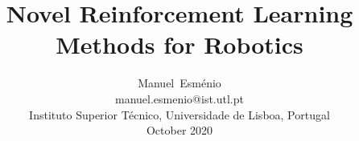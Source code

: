\documentclass[journal]{IEEEtran}
\begin{document}
%
\title{Novel Reinforcement Learning \\ Methods for Robotics}
%
%
%

\author{Manuel~Esménio \\ manuel.esmenio@ist.utl.pt \\ Instituto Superior Técnico, Universidade de Lisboa, Portugal \\ October 2020}%

% 
%

% 
\end{document}
